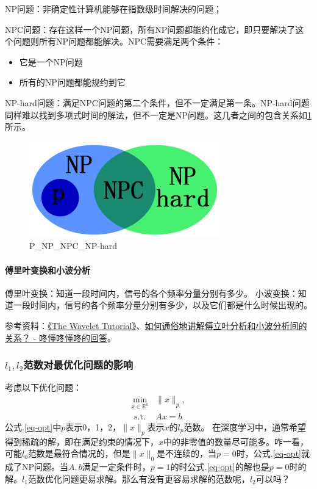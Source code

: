 NP问题：非确定性计算机能够在指数级时间解决的问题；

NPC问题：存在这样一个NP问题，所有NP问题都能约化成它，即只要解决了这个问题则所有NP问题都能解决。NPC需要满足两个条件：
\begin{itemize}
	\item 它是一个NP问题
	\item 所有的NP问题都能规约到它
\end{itemize}

NP-hard问题：满足NPC问题的第二个条件，但不一定满足第一条。NP-hard问题同样难以找到多项式时间的解法，但不一定是NP问题。这几者之间的包含关系如\ref{fig:P-NP-NPC-NP-hard}所示。

\begin{figure}[h]
	\centering
	\includegraphics[width=.4\textwidth]{pics/P-NP-NPC-NP-hard.jpeg}
	\caption{P\_NP\_NPC\_NP-hard}
	\label{fig:P-NP-NPC-NP-hard}
\end{figure}



\paragraph{傅里叶变换和小波分析}
傅里叶变换：知道一段时间内，信号的各个频率分量分别有多少。
小波变换：知道一段时间内，信号的各个频率分量分别有多少，以及它们都是什么时候出现的。

参考资料：\href{https://cseweb.ucsd.edu/~baden/Doc/wavelets/polikar_wavelets.pdf}{《The Wavelet Tutorial》}、\href{https://www.zhihu.com/question/22864189/answer/40772083}{如何通俗地讲解傅立叶分析和小波分析间的关系？ - 咚懂咚懂咚的回答}。

\subsubsection{$l_1, l_2$范数对最优化问题的影响}
考虑以下优化问题：
\begin{equation}
	\begin{aligned}
		\min _{x \in \mathbb{R}^{n}} &\|x\|_{p}, \\
		\text { s.t. } & A x=b \label{eq-opt}
	\end{aligned}
\end{equation}
公式.\ref{eq-opt}中$p$表示0，1，2，$\|x\|_{p}$表示$x$的$l_p$范数。
在深度学习中，通常希望得到稀疏的解，即在满足约束的情况下，$x$中的非零值的数量尽可能多。咋一看，可能$l_0$范数是最符合情况的，但是$\|x\|_0$是不连续的，当$p=0$时，公式.\ref{eq-opt}就成了NP问题。当$A, b$满足一定条件时，$p=1$的时公式.\ref{eq-opt}的解也是$p=0$时的解。$l_1$范数优化问题更易求解。那么有没有更容易求解的范数呢，$l_2$可以吗？

